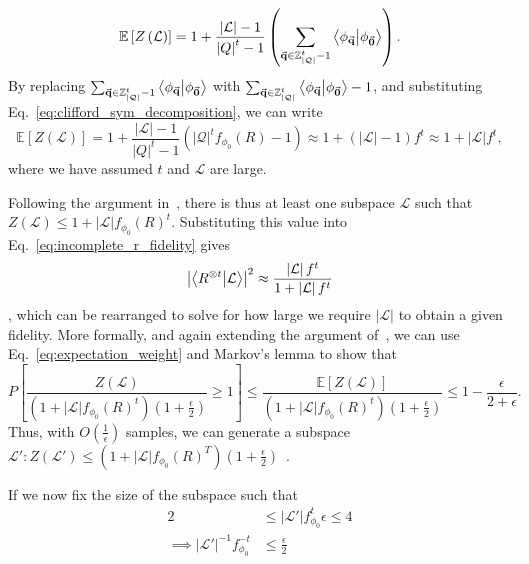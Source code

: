 \begin{equation}
\mathbb{E}\left[Z\left(\mathcal{L}\right)\right] = 1 + \frac{\left|\mathcal{L}\right|-1}{\left|Q\right|^{t}-1}\left(\sum_{\va{q}\in\mathbb{Z}_{\left|\mathcal{Q}\right|}^{t}-1}\braket{\phi_{\va{q}}}{\phi_{\va{0}}}\right).
\end{equation}
By replacing $\sum_{\va{q}\in\mathbb{Z}_{\left|\mathcal{Q}\right|}^{t}-1}\braket{\phi_{\va{q}}}{\phi_{\va{0}}}$ with $\sum_{\va{q}\in\mathbb{Z}_{\left|\mathcal{Q}\right|}^{t}}\braket{\phi_{\va{q}}}{\phi_{\va{0}}} -1$, and substituting Eq.~\ref{eq:clifford_sym_decomposition}, we can write
\begin{equation}
\mathbb{E}\left[Z\left(\mathcal{L}\right)\right] = 1 + \frac{\left|\mathcal{L}\right|-1}{\left|Q\right|^{t}-1}\left(\left|\mathcal{Q}\right|^{t}f_{\phi_{0}}\left(R\right)-1\right)\approx 1+\left(\left|\mathcal{L}\right|-1\right)f^{t}\approx 1+\left|\mathcal{L}\right|f^{t},
\label{eq:expectation_weight}
\end{equation}
where we have assumed $t$ and $\mathcal{L}$ are large.\par
Following the argument in~\cite{Bravyi2016}, there is thus at least one subspace $\mathcal{L}$ such that $Z\left(\mathcal{L}\right)\leq 1+\left|\mathcal{L}\right|f_{\phi_{0}}(R)^{t}$. Substituting this value into Eq.~\ref{eq:incomplete_r_fidelity} gives
\[
\left|\braket{R^{\otimes t}}{\mathcal{L}}\right|^{2} \approx \frac{\left|\mathcal{L}\right|f^{t}}{1+\left|\mathcal{L}\right|f^{t}}
\],
which can be rearranged to solve for how large we require $\left|\mathcal{L}\right|$ to obtain a given fidelity. More formally, and again extending the argument of~\cite{Bravyi2016}, we can use Eq.~\ref{eq:expectation_weight} and Markov's lemma to show that
\[P\left[ \frac{Z\left(\mathcal{L}\right)}{\left(1+\left|\mathcal{L}\right|f_{\phi_{0}}(R)^{t}\right)(1+\frac{\epsilon}{2})}\geq 1 \right] \leq \frac{\mathbb{E}\left[Z(\mathcal{L})\right]}{\left(1+\left|\mathcal{L}\right|f_{\phi_{0}}(R)^{t}\right)(1+\frac{\epsilon}{2})}\leq 1 - \frac{\epsilon}{2+\epsilon}.\]
Thus, with $O(\frac{1}{\epsilon})$ samples, we can generate a subspace $\mathcal{L'}:Z\left(\mathcal{L'}\right)\leq \left(1+\left|\mathcal{L}\right|f_{\phi_{0}}(R)^{T}\right)\left(1+\frac{\epsilon}{2}\right)$~\cite{Bravyi2016}.\par
If we now fix the size of the subspace such that
\begin{align*}
2&\leq \left|\mathcal{L'}\right|f_{\phi_{0}}^{t}\epsilon \leq 4 \\
\implies \left|\mathcal{L'}\right|^{-1}f_{\phi_{0}}^{-t}&\leq \frac{\epsilon}{2}
\end{align*}
